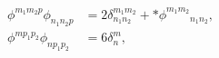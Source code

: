 \begin{equation}
\begin{aligned}
   \phi^{m_1m_2p}\phi_{n_1n_2p} 
      &= 2\delta^{m_1m_2}_{n_1n_2} + {*\phi}^{m_1m_2}{}_{n_1n_2} , \\
   \phi^{mp_1p_2}\phi_{np_1p_2} &= 6\delta^{m}_{n} , 
\end{aligned}
\end{equation}

